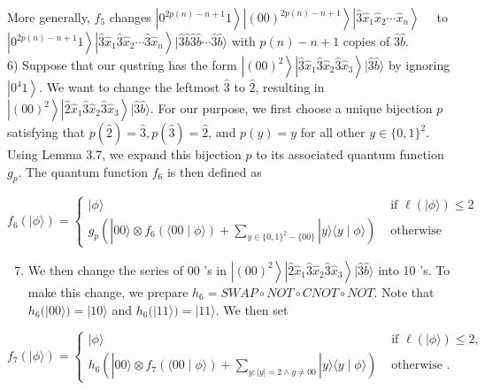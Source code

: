\documentclass[10pt]{article}
\begin{document}
More generally, $f_{5}$ changes $\left|0^{2 p(n)-n+1} 1\right\rangle\left|(00)^{2 p(n)-n+1}\right\rangle\left|\hat{3} \hat{x}_{1} \hat{x}_{2} \cdots \hat{x}_{n}\right\rangle \quad$ to $\left|0^{2 p(n)-n+1} 1\right\rangle\left|\hat{3} \hat{x}_{1} \hat{3} \hat{x}_{2} \cdots \hat{3} \hat{x}_{n}\right\rangle|\hat{3} \hat{b} \hat{3} \hat{b} \cdots \hat{3} \hat{b}\rangle$ with $p(n)-n+1$ copies of $\hat{3} \hat{b}$.\\
6) Suppose that our qustring has the form $\left|(00)^{2}\right\rangle\left|\hat{3} \hat{x}_{1} \hat{3} \hat{x}_{2} \hat{3} \hat{x}_{3}\right\rangle|\hat{3} \hat{b}\rangle$ by ignoring $\left|0^{4} 1\right\rangle$. We want to change the leftmost $\hat{3}$ to $\hat{2}$, resulting in $\left|(00)^{2}\right\rangle\left|\hat{2} \hat{x}_{1} \hat{3} \hat{x}_{2} \hat{3} \hat{x}_{3}\right\rangle|\hat{3} \hat{b}\rangle$. For our purpose, we first choose a unique bijection $p$ satisfying that $p(\hat{2})=\hat{3}, p(\hat{3})=\hat{2}$, and $p(y)=y$ for all other $y \in\{0,1\}^{2}$. Using Lemma 3.7, we expand this bijection $p$ to its associated quantum function $g_{p}$. The quantum function $f_{6}$ is then defined as

$$
f_{6}(|\phi\rangle)= \begin{cases}|\phi\rangle & \text { if } \ell(|\phi\rangle) \leq 2 \\ g_{p}\left(|00\rangle \otimes f_{6}(\langle 00 \mid \phi\rangle)+\sum_{y \in\{0,1\}^{2}-\{00\}}|y\rangle\langle y \mid \phi\rangle\right) & \text { otherwise }\end{cases}
$$

\begin{enumerate}
  \setcounter{enumi}{6}
  \item We then change the series of 00 's in $\left|(00)^{2}\right\rangle\left|\hat{2} \hat{x}_{1} \hat{3} \hat{x}_{2} \hat{3} \hat{x}_{3}\right\rangle|\hat{3} \hat{b}\rangle$ into 10 's. To make this change, we prepare $h_{6}=S W A P \circ N O T \circ C N O T \circ N O T$. Note that $h_{6}(|00\rangle)=|10\rangle$ and $h_{6}(|11\rangle)=|11\rangle$. We then set
\end{enumerate}

$$
f_{7}(|\phi\rangle)= \begin{cases}|\phi\rangle & \text { if } \ell(|\phi\rangle) \leq 2, \\ h_{6}\left(|00\rangle \otimes f_{7}(\langle 00 \mid \phi\rangle)+\sum_{y:|y|=2 \wedge y \neq 00}|y\rangle\langle y \mid \phi\rangle\right) & \text { otherwise } .\end{cases}
$$
\end{document}
